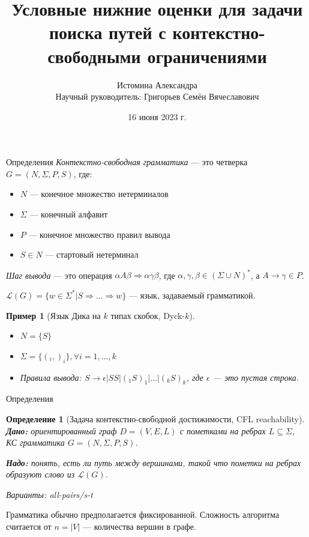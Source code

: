\documentclass{beamer}
\title[]{Условные нижние оценки для задачи поиска путей с контекстно-свободными ограничениями}
\author[Истомина Александра (СПбГУ)]{Истомина Александра \\ \vspace{1cm}
\small{Научный руководитель: Григорьев Семён Вячеславович}}
\institute{Санкт-Петербургский государственный университет}
\date{16 июня 2023 г.}
\newtheorem{defin}{Определение}
\newtheorem{exampl}{Пример}
\begin{document}
	
\begin{frame}
	\titlepage
\end{frame}

\begin{frame}{Определения}
	\textit{Контекстно-свободная грамматика} --- это четверка $G=(N, \Sigma, P, S)$, где:
	
	\begin{itemize}
		\item $N$ --- конечное множество нетерминалов
		\item $\Sigma$ --- конечный алфавит
		\item $P$ --- конечное множество правил вывода
		\item $S \in N$ --- стартовый нетерминал
	\end{itemize}

	\textit{Шаг вывода} --- это операция $\alpha A \beta \Rightarrow \alpha \gamma \beta$, где $\alpha, \gamma, \beta \in (\Sigma \cup N)^*$, а $A \rightarrow \gamma \in P$. 
	
	$\mathcal{L}(G) = \{w \in \Sigma^*| S \Rightarrow \ldots \Rightarrow w\}$ --- язык, задаваемый грамматикой.
	
	\begin{exampl}[Язык Дика на $k$ типах скобок, Dyck-$k$]
		\begin{itemize}
			\item $N = \{S\}$
			\item $\Sigma = \{(_i, )_i\}, \forall i = 1, \ldots, k$
			\item Правила вывода: $S \rightarrow \epsilon | SS | (_1 S )_1 | \ldots | (_k S )_k$, где $\epsilon$ --- это пустая строка. 
		\end{itemize}
	\end{exampl}
\end{frame}

\begin{frame}{Определения}
	\begin{defin}[Задача контекстно-свободной достижимости, CFL reachability]
		\textbf{Дано:} ориентированный граф $D = (V, E, L)$ с пометками на ребрах $L \subseteq \Sigma$, КС грамматика $G = (N, \Sigma, P, S)$.
		
		\textbf{Надо:} понять, есть ли путь между вершинами, такой что пометки на ребрах образуют слово из $\mathcal{L}(G)$.
		
		Варианты: all-pairs/s-t
	\end{defin}

	Грамматика обычно предполагается фиксированной. Сложность алгоритма считается от $n = |V|$ --- количества вершин в графе.
\end{frame}
	
\end{document}
